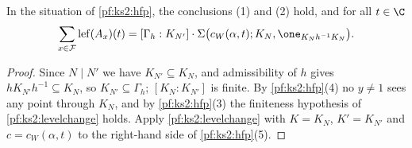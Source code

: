 \begin{corollary}\label{pf:ks2:fixz}
In the situation of \cref{pf:ks2:hfp}, the conclusions (1) and (2) hold, and for all $t\in\C$
\[
\sum_{x\in\mathcal F}\mathrm{lef}(A_x)(t)=[\Gamma_h:K_{N'}]\cdot\Sigma\bigl(c_W(\alpha,t);K_N,\one_{K_Nh^{-1}K_N}\bigr).
\]
\end{corollary}

\begin{proof}
Since $N\mid N'$ we have $K_{N'}\subseteq K_N$, and admissibility
of $h$ gives $hK_{N'}h^{-1}\subseteq K_N$, so $K_{N'}\subseteq\Gamma_h$; $[K_N:K_{N'}]$ is finite. By
\cref{pf:ks2:hfp}(4) no $y\ne1$ sees any point through $K_N$, and by \cref{pf:ks2:hfp}(3) the finiteness
hypothesis of \cref{pf:ks2:levelchange} holds. Apply \cref{pf:ks2:levelchange} with $K=K_N$, $K'=K_{N'}$
and $c=c_W(\alpha,t)$ to the right-hand side of \cref{pf:ks2:hfp}(5).
\end{proof}

